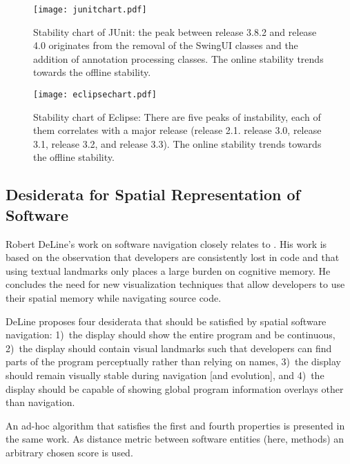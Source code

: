\begin{figure}
\begin{center}
  \texttt{[image: junitchart.pdf]}
\end{center}
    \caption{Stability chart of JUnit: the peak between release 3.8.2 and release 4.0 originates from the removal of the SwingUI classes and the addition of annotation processing classes. The online stability trends towards the offline stability.}
    \label{fig:junitchart}
\end{figure}

\begin{figure}
\begin{center}
  \texttt{[image: eclipsechart.pdf]}
\end{center}
    \caption{Stability chart of Eclipse: There are five peaks of instability, each of them correlates with a major release (\ie release 2.1. release 3.0, release 3.1, release 3.2, and release 3.3). The online stability trends towards the offline stability.}
    \label{fig:eclipsechart}
\end{figure}


\subsection{Desiderata for Spatial Representation of Software}

Robert DeLine's work on software navigation \cite{Deli05b,Deli06a} closely relates to \SOCA. His work is based on the observation that developers are consistently lost in code \cite{Deli05a} and that using textual landmarks only places a large burden on cognitive memory. He concludes the need for new visualization techniques that allow developers to use their spatial memory while navigating source code.

DeLine proposes four desiderata \cite{Deli05b} that should be satisfied by spatial software navigation: 1)~the display should show the entire program and be continuous, 2)~the display should contain visual landmarks such that developers can find parts of the program perceptually rather than relying on names, 3)~the display should remain visually stable during navigation [and evolution], and 4)~the display should be capable of showing global program information overlays other than navigation.

An ad-hoc algorithm that satisfies the first and fourth properties is presented in the same work. As distance metric between software entities (here, methods) an arbitrary chosen score is used.

